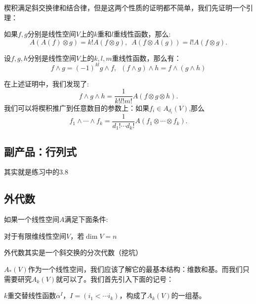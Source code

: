     楔积满足斜交换律和结合律，但是这两个性质的证明都不简单，我们先证明一个引理：

    \begin{lemma}
        如果\(f,g\)分别是线性空间\(V\)上的\(k\)重和\(l\)重线性函数，那么:\[A(A(f)\otimes g) = k!A(f\otimes g),\enspace A(f\otimes A(g)) = l!A(f\otimes g).\]
    \end{lemma}

    \begin{theorem}[楔积的斜交换律与结合律]
        设\(f,g,h\)分别是线性空间\(V\)上的\(k,l,m\)重线性函数，那么有：
        \[f\wedge g = (-1)^{kl}g\wedge f,\enspace(f\wedge g)\wedge h = f\wedge(g\wedge h)\]
    \end{theorem}
    
    在上述证明中，我们发现了:\[f\wedge g\wedge h = \frac{1}{k!l!m!}A(f\otimes g\otimes h).\]
    我们可以将楔积推广到任意数目的参数上：如果\(f_i\in A_{d_i}(V)\),那么\[f_1\wedge\cdots\wedge f_k = \frac{1}{d_1!\cdots d_k!}A(f_1\otimes\cdots\otimes f_k).\]

    \subsection{副产品：行列式}
    
    其实就是练习中的3.8

    \subsection{外代数}

    \begin{definition}[代数]
        如果一个线性空间\(A\)满足下面条件:
    \end{definition}
    
    \begin{definition}[外代数]
        对于有限维线性空间\(V\)，若\(\dim V = n\)
    \end{definition}

    外代数其实是一个斜交换的分次代数（挖坑）

    \(A_*(V)\)作为一个线性空间，我们应该了解它的最基本结构：维数和基。而我们只需要研究\(A_k(V)\)就可以了。我们首先引入下面的记号：

    \begin{lemma}
        
    \end{lemma}

    \begin{theorem}
        \(k\)重交替线性函数\(\alpha^I\)，\enspace\(I=(i_1<\cdots i_k)\)，构成了\(A_k(V)\)的一组基。
    \end{theorem}


